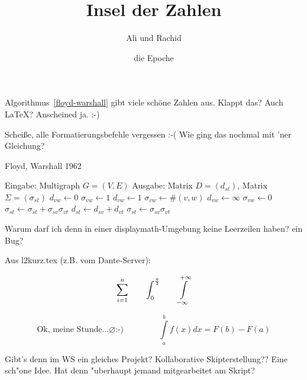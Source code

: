 \documentclass{scrartcl}
\title{Insel der Zahlen}
\author{Ali und Rachid}
\date{die Epoche}
\begin{document}

\maketitle

Algorithmus~\ref{floyd-warshall} gibt viele schöne Zahlen aus.
Klappt das? Auch \LaTeX{}? Anscheined ja. :-)

Scheiße, alle Formatierungsbefehle vergessen :-(
\newline
Wie ging das nochmal mit 'ner Gleichung?

\begin{algorithm}
  \label{floyd-warshall}
  \caption{Floyd, Warshall 1962}
  \begin{algorithmic}[5]
    \STATE Eingabe: Multigraph $G=(V,E)$
    \STATE Ausgabe: Matrix $D= (d_{st})$, Matrix $\Sigma= (\sigma_{st})$
        \STATE $d_{vw} \leftarrow 0$
	\STATE $\sigma_{vw} \leftarrow 1$
        \STATE $d_{vw} \leftarrow 1$
	\STATE $\sigma_{vw} \leftarrow \#(v,w)$
      \ELSE
        \STATE $d_{vw} \leftarrow \infty$
	\STATE $\sigma_{vw} \leftarrow 0$
      \ENDIF
    \ENDFOR
	    \STATE $\sigma_{st} \leftarrow \sigma_{st} + \sigma_{sv}\sigma_{vt}$
	    \STATE $d_{st} \leftarrow d_{sv} + d_{vt}$
	    \STATE $\sigma_{st} \leftarrow \sigma_{sv}\sigma_{vt}$
	  \ENDIF
	\ENDFOR
      \ENDFOR
    \ENDFOR
  \end{algorithmic}
\end{algorithm}

Warum darf ich denn in einer displaymath-Umgebung keine Leerzeilen haben? ein Bug?

Aus l2kurz.tex (z.B. vom Dante-Server):

\begin{displaymath}
\sum_{i=1}^{n} \qquad
\int_{0}^{\frac{\pi}{2}} \qquad
\int \limits_{-\infty}^{+\infty}\\
\end{displaymath}

\begin{displaymath}
\textrm{Ok, meine Stunde}\ldots \varnothing \texttt{:-)} \qquad \  \qquad
\int \limits_{a}^{b} f(x) d x = F(b) - F(a)
\end{displaymath}

Gibt's denn im WS ein gleiches Projekt? Kollaborative Skipterstellung?? Eine sch"one Idee. Hat denn "uberhaupt jemand mitgearbeitet am Skript?
\end{document}
